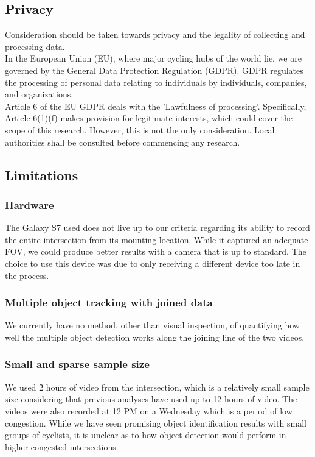 \subsection{Privacy}

Consideration should be taken towards privacy and the legality of collecting and processing data.
\ \\

In the European Union (EU), where major cycling hubs of the world lie, we are governed by the General Data Protection Regulation (GDPR). GDPR regulates the processing of personal data 
relating to individuals by individuals, companies, and organizations.
\ \\

Article 6 of the EU GDPR deals with the 'Lawfulness of processing'. Specifically, Article 6(1)(f)
makes provision for legitimate interests, which could cover the scope of this research.
However, this is not the only consideration. Local authorities shall be consulted before commencing any research.
\ \\

\subsection{Limitations}
\subsubsection{Hardware}
The Galaxy S7 used does not live up to our criteria regarding its 
ability to record the entire intersection from its mounting location. While it captured an adequate 
FOV, we could produce better results with a camera that is up to standard. The choice to use this device 
was due to only receiving a different device too late in the process.
\ \\

\subsubsection{Multiple object tracking with joined data}
We currently have no method, other than visual inspection, of quantifying how well the multiple object 
detection works along the joining line of the two videos.
\ \\

\subsubsection{Small and sparse sample size}
We used \~2 hours of video from the intersection, which is a relatively small sample size considering
that previous analyses have used up to 12 hours of video. The videos were also recorded at 12 PM on a Wednesday 
which is a period of low congestion. While we have seen promising object identification results with small groups
of cyclists, it is unclear as to how object detection would perform in higher congested intersections. 
\ \\

